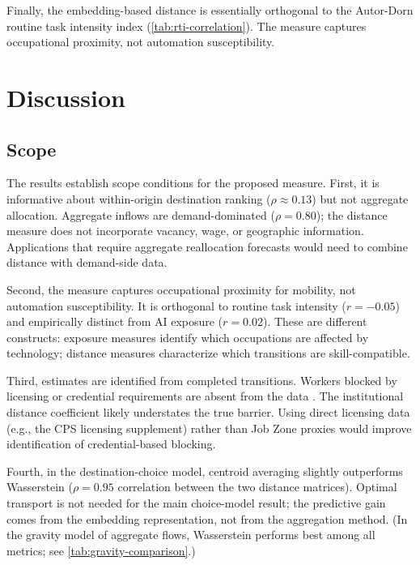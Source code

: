 \documentclass[12pt]{article}
\begin{document}
Finally, the embedding-based distance is essentially orthogonal to the Autor-Dorn routine task intensity index (\cref{tab:rti-correlation}). The measure captures occupational proximity, not automation susceptibility.


\section{Discussion}
\label{sec:discussion}


\subsection{Scope}

The results establish scope conditions for the proposed measure. First, it is informative about within-origin destination ranking ($\rho \approx 0.13$) but not aggregate allocation. Aggregate inflows are demand-dominated ($\rho = 0.80$); the distance measure does not incorporate vacancy, wage, or geographic information. Applications that require aggregate reallocation forecasts would need to combine distance with demand-side data.

Second, the measure captures occupational proximity for mobility, not automation susceptibility. It is orthogonal to routine task intensity ($r = -0.05$) and empirically distinct from AI exposure ($r = 0.02$). These are different constructs: exposure measures identify which occupations are affected by technology; distance measures characterize which transitions are skill-compatible.

Third, estimates are identified from completed transitions. Workers blocked by licensing or credential requirements are absent from the data \citep{Jackson2023,Heckman1979}. The institutional distance coefficient likely understates the true barrier. Using direct licensing data (e.g., the CPS licensing supplement) rather than Job Zone proxies would improve identification of credential-based blocking.

Fourth, in the destination-choice model, centroid averaging slightly outperforms Wasserstein ($\rho = 0.95$ correlation between the two distance matrices). Optimal transport is not needed for the main choice-model result; the predictive gain comes from the embedding representation, not from the aggregation method. (In the gravity model of aggregate flows, Wasserstein performs best among all metrics; see \cref{tab:gravity-comparison}.)
\end{document}
